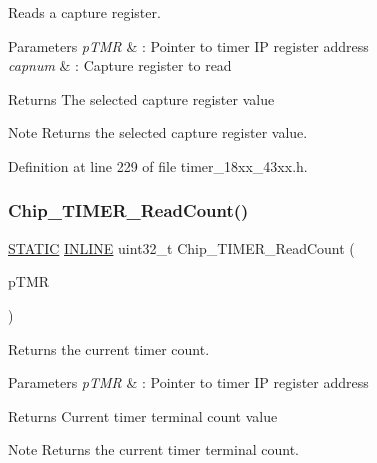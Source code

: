 Reads a capture register. 


\begin{DoxyParams}{Parameters}
{\em p\+T\+MR} & \+: Pointer to timer IP register address \\
\hline
{\em capnum} & \+: Capture register to read \\
\hline
\end{DoxyParams}
\begin{DoxyReturn}{Returns}
The selected capture register value 
\end{DoxyReturn}
\begin{DoxyNote}{Note}
Returns the selected capture register value. 
\end{DoxyNote}


Definition at line 229 of file timer\+\_\+18xx\+\_\+43xx.\+h.

\mbox{\label{group___t_i_m_e_r__18_x_x__43_x_x_ga6050d4da70d679696b3af922b8c1a6ac}} 
\subsubsection{\texorpdfstring{Chip\+\_\+\+T\+I\+M\+E\+R\+\_\+\+Read\+Count()}{Chip\_TIMER\_ReadCount()}}
{\footnotesize\ttfamily \hyperlink{group___l_p_c___types___public___macros_ga10b2d890d871e1489bb02b7e70d9bdfb}{S\+T\+A\+T\+IC} \hyperlink{spifi__18xx__43xx_8h_a2eb6f9e0395b47b8d5e3eeae4fe0c116}{I\+N\+L\+I\+NE} uint32\+\_\+t Chip\+\_\+\+T\+I\+M\+E\+R\+\_\+\+Read\+Count (\begin{DoxyParamCaption}\item[{\hyperlink{struct_l_p_c___t_i_m_e_r___t}{L\+P\+C\+\_\+\+T\+I\+M\+E\+R\+\_\+T} $\ast$}]{p\+T\+MR }\end{DoxyParamCaption})}



Returns the current timer count. 


\begin{DoxyParams}{Parameters}
{\em p\+T\+MR} & \+: Pointer to timer IP register address \\
\hline
\end{DoxyParams}
\begin{DoxyReturn}{Returns}
Current timer terminal count value 
\end{DoxyReturn}
\begin{DoxyNote}{Note}
Returns the current timer terminal count. 
\end{DoxyNote}


